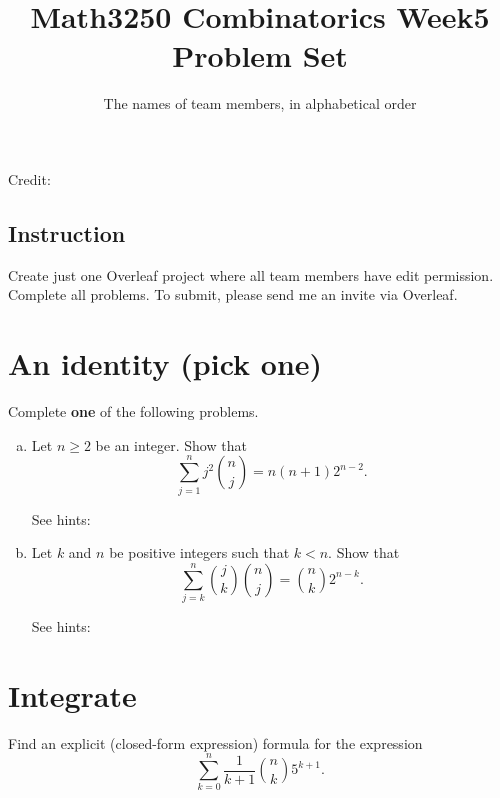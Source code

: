 \documentclass[12pt]{amsart}
\title{Math3250 Combinatorics Week5 Problem Set}
\author{The names of team members, in alphabetical order}
\date{}
\begin{document}
\maketitle


\noindent Credit: 

\subsection*{Instruction}
Create just one Overleaf project where all team members have edit permission. Complete all problems. 
To submit, please send me an invite via Overleaf. 

\bigskip 



\section{An identity (pick one)}\label{sec:identity}
Complete \textbf{one} of the following problems. 

\begin{enumerate}[a.)]
\item \label{itm:identity}
Let $n \geq 2$ be an integer.
Show that 
\[
\sum_{j=1}^n j^2 {n \choose j} = n (n+1) 2^{n-2}.
\]


\noindent See hints:

\item 
Let $k$ and $n$ be positive integers such that $k < n$. 
Show that 
\[
\sum_{j=k}^n {j \choose k } {n \choose j} =  {n \choose k} 2^{n-k}.
\]

\noindent See hints:

\end{enumerate}



\section{Integrate}
Find an explicit (closed-form expression) formula for the expression
\[
\sum_{k=0}^n \frac{1}{k+1} {n \choose k} 5^{k+1}.
\]
\end{document}
